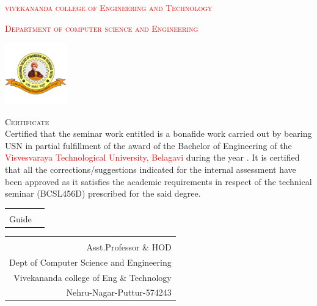 \documentclass{article}
\begin{document}
	\begin{titlepage}
		\begin{center}
			\textcolor{red}{\textsc{vivekananda college of Engineering and Technology}}\\
		\end{center}
		\centering\textcolor{red}{\textsc{Department of computer science and Engineering}}\vspace{1cm}
	
			\centering\includegraphics[width=0.2\textwidth]{vcet_logo.png}\par\vspace{1cm}
			\huge{\scshape{Certificate}}\\
		\vspace{1cm}
		\normalsize
			\justifying
			Certified that the seminar work entitled \underline{\hspace{3cm}} is a bonafide work carried out by \underline{\hspace{3cm}} bearing USN \underline{\hspace{3cm}} in partial fulfillment of the award of the Bachelor of Engineering of the \textcolor{red}{Visvesvaraya Technological University, Belagavi} during the year \underline{\hspace{2cm}}. It is certified that all the corrections/suggestions indicated for the internal assessment have been approved as it satisfies the academic requirements in respect of the technical seminar (BCSL456D) prescribed for the said degree.
			
		\vfill\noindent
	\begin{tabular}[t]{@{}ll}
		\underline{\hspace{3cm}}\\
		Guide
	\end{tabular}
	\hfill
		\begin{tabular}[t]{r@{}}
		\underline{\hspace{4cm}}\\
		Asst.Professor \& HOD\\
		Dept of Computer Science and Engineering \\
		Vivekananda college of Eng \& Technology\\
		Nehru-Nagar-Puttur-574243\\
		
	\end{tabular}
	\end{titlepage}
\end{document}

